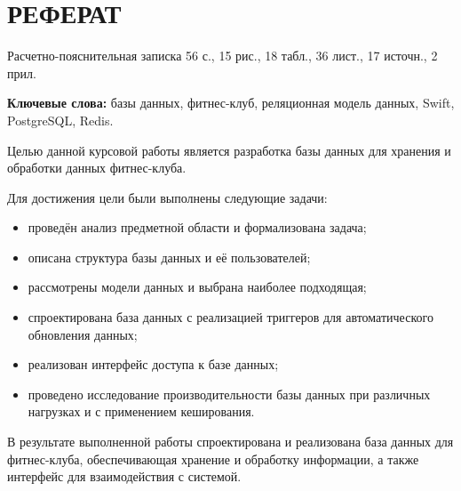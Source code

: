 \section*{РЕФЕРАТ}

Расчетно-пояснительная записка 56 с., 15 рис., 18  табл., 36 лист., 17 источн., 2 прил.

\textbf{Ключевые слова:} базы данных, фитнес-клуб, реляционная модель данных, Swift, PostgreSQL, Redis.

Целью данной курсовой работы является разработка базы данных для хранения и обработки данных фитнес-клуба.  

Для достижения цели были выполнены следующие задачи:  
\begin{itemize}
	\item проведён анализ предметной области и формализована задача;  
	\item описана структура базы данных и её пользователей;  
	\item рассмотрены модели данных и выбрана наиболее подходящая;  
	\item спроектирована база данных с реализацией триггеров для автоматического обновления данных;  
	\item реализован интерфейс доступа к базе данных;  
	\item проведено исследование производительности базы данных при различных нагрузках и с применением кеширования.  
\end{itemize}

В результате выполненной работы спроектирована и реализована база данных для фитнес-клуба, обеспечивающая хранение и обработку информации, а также интерфейс для взаимодействия с системой.
